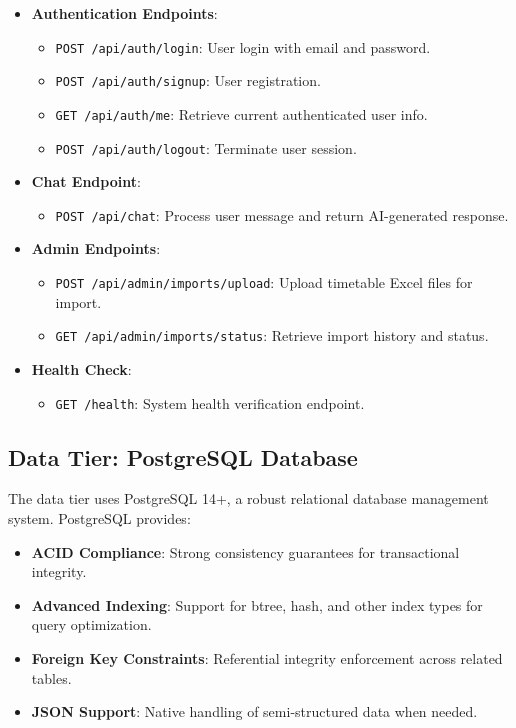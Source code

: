 \begin{itemize}
    \item \textbf{Authentication Endpoints}:
    \begin{itemize}
        \item \texttt{POST /api/auth/login}: User login with email and password.
        \item \texttt{POST /api/auth/signup}: User registration.
        \item \texttt{GET /api/auth/me}: Retrieve current authenticated user info.
        \item \texttt{POST /api/auth/logout}: Terminate user session.
    \end{itemize}
    
    \item \textbf{Chat Endpoint}:
    \begin{itemize}
        \item \texttt{POST /api/chat}: Process user message and return AI-generated response.
    \end{itemize}
    
    \item \textbf{Admin Endpoints}:
    \begin{itemize}
        \item \texttt{POST /api/admin/imports/upload}: Upload timetable Excel files for import.
        \item \texttt{GET /api/admin/imports/status}: Retrieve import history and status.
    \end{itemize}
    
    \item \textbf{Health Check}:
    \begin{itemize}
        \item \texttt{GET /health}: System health verification endpoint.
    \end{itemize}
\end{itemize}

\subsection{Data Tier: PostgreSQL Database}

The data tier uses PostgreSQL 14+, a robust relational database management system. PostgreSQL provides:

\begin{itemize}
    \item \textbf{ACID Compliance}: Strong consistency guarantees for transactional integrity.
    \item \textbf{Advanced Indexing}: Support for btree, hash, and other index types for query optimization.
    \item \textbf{Foreign Key Constraints}: Referential integrity enforcement across related tables.
    \item \textbf{JSON Support}: Native handling of semi-structured data when needed.
\end{itemize}

